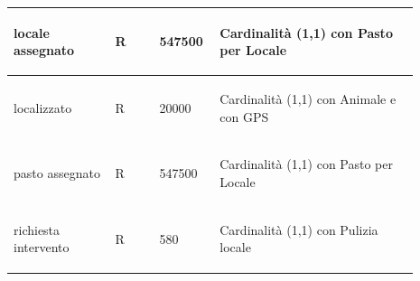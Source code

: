 \documentclass[12pt,a4paper]{article}
\begin{document}
\begin{center}
\begin{longtable}{|p{0.23\linewidth}|p{0.1\linewidth}|p{0.11\linewidth}|p{0.45\linewidth}|}
\hline
locale assegnato 				& \begin{center}
\vspace{-25pt}R
\end{center}
					& \begin{center}
					\vspace{-25pt}547500\end{center}
					& \begin{flushleft}\vspace{-25pt} Cardinalità (1,1) con Pasto per Locale \end{flushleft}\\ 

\hline
localizzato 				& \begin{center}
\vspace{-25pt}R
\end{center}
					& \begin{center}
					\vspace{-25pt}20000\end{center}
					& \begin{flushleft}\vspace{-25pt} Cardinalità (1,1) con Animale e con GPS \end{flushleft}\\ 

\hline
pasto assegnato 				& \begin{center}
\vspace{-25pt}R
\end{center}
					& \begin{center}
					\vspace{-25pt}547500\end{center}
					& \begin{flushleft}\vspace{-25pt} Cardinalità (1,1) con Pasto per Locale \end{flushleft}\\ 

\hline
richiesta intervento 				& \begin{center}
\vspace{-25pt}R
\end{center}
					& \begin{center}
					\vspace{-25pt}580\end{center}
					& \begin{flushleft}\vspace{-25pt} Cardinalità (1,1) con Pulizia locale \end{flushleft}\\ 


\end{longtable}
\end{center}
\end{document}
